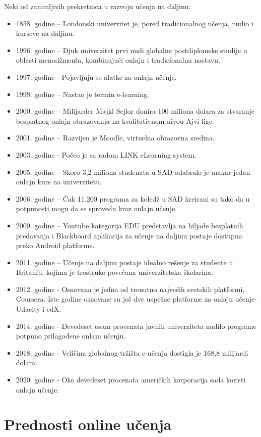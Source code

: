 \documentclass{article}
\begin{document}
Neki od zanimljivih prekretnica u razvoju učenja na daljinu:
\begin{itemize}
    \item 1858. godine – Londonski univerzitet je, pored tradicionalnog učenja, nudio i kurseve na daljinu.
    \item 1996. godine – Djuk univerzitet prvi nudi globalne postdiplomske studije u oblasti menadžmenta, kombinujući onlajn i tradicionalnu nastavu.
    \item 1997. godine - Pojavljuju se alatke za onlajn učenje.
    \item 1998. godine – Nastao je termin e-learning.
    \item 2000. godine – Milijarder Majkl Sejlor donira 100 miliona dolara za stvaranje besplatnog onlajn obrazovanja na kvalitativnom nivou Ajvi lige.
    \item 2001. godine – Razvijen je Moodle, virtuelna obrazovna sredina.
    \item 2003. godine - Počeo je sa radom LINK eLearning system.
    \item 2005. godine – Skoro 3,2 miliona studenata u SAD odabralo je makar jedan onlajn kurs na univerzitetu.
    \item 2006. godine – Čak 11.200 programa za koledž u SAD kreirani su tako da u potpunosti mogu da se sprovedu kroz onlajn učenje.
    \item 2009. godine – Youtube kategorija EDU predstavlja na hiljade besplatnih predavanja i Blackboard aplikacija za učenje na daljinu postaje dostupna preko Android platforme.
    \item 2011. godine – Učenje na daljinu postaje idealno rešenje za studente u Britaniji, kojima je trostruko povećana univerzitetska školarina.
    \item 2012. godine - Osnovana je jedna od trenutno najvećih svetskih platformi, Coursera. Iste godine osnovane su još dve uspešne platforme za onlajn učenje- Udacity i edX.
    \item 2014. godine - Devedeset osam procenata javnih univerziteta nudilo programe potpuno prilagođene onlajn učenju.
    \item 2018. godine - Veličina globalnog tržišta e-učenja dostigla je 168,8 milijardi dolara.
    \item 2020. godine - Oko devedeset procenata američkih korporacija sada koristi onlajn učenje.\cite{1}
\end{itemize}

\section{Prednosti online učenja}
\end{document}

